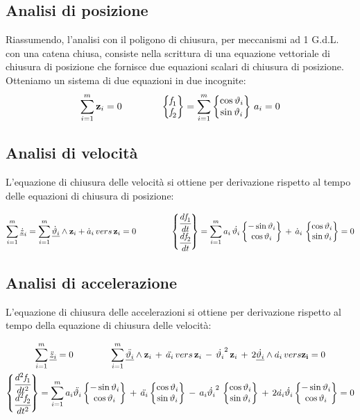 		\subsection{Analisi di posizione}
			Riassumendo, l'analisi con il poligono di chiusura, per meccanismi ad 1 G.d.L. con una catena chiusa, consiste nella scrittura di una equazione vettoriale di chiusura di posizione che fornisce due equazioni scalari di chiusura di posizione. Otteniamo un sistema di due equazioni in due incognite:
			\[
			\sum_{i=1}^{m}\mathbf{z}_i = 0 \qquad\qquad \begin{Bmatrix}\emph{f}_1\\\emph{f}_2\end{Bmatrix} = \sum_{i=1}^{m} \begin{Bmatrix}\cos{\vartheta_i}\\\sin{\vartheta_i}\end{Bmatrix}\,a_i = 0
			\]
		
		\subsection{Analisi di velocità}
		
		L'equazione di chiusura delle velocità si ottiene per derivazione rispetto al tempo delle equazioni di chiusura di posizione:
		
			\[
			\sum_{i=1}^{m}\underline{\dot{z}}_i = \sum_{i=1}^{m}\underline{\dot{\vartheta}_i}\wedge\mathbf{z}_i + \dot{a}_i\, vers\,\mathbf{z}_i = 0 \qquad\qquad \begin{Bmatrix}\cfrac{d\emph{f}_1}{dt}\\\cfrac{d\emph{f}_2}{dt}\end{Bmatrix}= \sum_{i=1}^{m} a_i\,\dot{\vartheta_i}\begin{Bmatrix}-\sin{\vartheta_i}\\\cos{\vartheta_i}\end{Bmatrix}\, +\,\dot{a}_i\,\begin{Bmatrix}\cos{\vartheta_i}\\\sin{\vartheta_i}\end{Bmatrix}= 0
			\]
		
		\subsection{Analisi di accelerazione}
		
		L'equazione di chiusura delle accelerazioni si ottiene per derivazione rispetto al tempo della equazione di chiusura delle velocità:
		
		\begin{gather*}
		\sum_{i=1}^{m}\underline{\ddot{z}_i}=0\qquad\qquad \sum_{i=1}^{m}\underline{\ddot{\vartheta_i}}\wedge\mathbf{z}_i\,+\,\ddot{a_i}\,vers\,\mathbf{z}_i\,-\,\dot{\vartheta_i}^2\,\mathbf{z}_i\,+\,2\underline{\dot{\vartheta_i}}\wedge \dot{a_i}\,vers\mathbf{z_i} = 0\\
		\begin{Bmatrix}\cfrac{d^2\emph{f}_1}{dt^2}\\\cfrac{d^2\emph{f}_2}{dt^2}\end{Bmatrix} = \sum_{i=1}^{m}a_i\ddot{\vartheta_i}\begin{Bmatrix}-\sin{\vartheta_i}\\\cos{\vartheta_i}\end{Bmatrix}\,+\,\ddot{a_i}\begin{Bmatrix}\cos{\vartheta_i}\\\sin{\vartheta_i}\end{Bmatrix}\,-\,a_i\dot{\vartheta_i}^2\,\begin{Bmatrix}\cos{\vartheta_i}\\\sin{\vartheta_i}\end{Bmatrix}\,+\,2\dot{a_i}\dot{\vartheta_i}\begin{Bmatrix}-\sin{\vartheta_i}\\\cos{\vartheta_i}\end{Bmatrix}=0
		\end{gather*}
		
